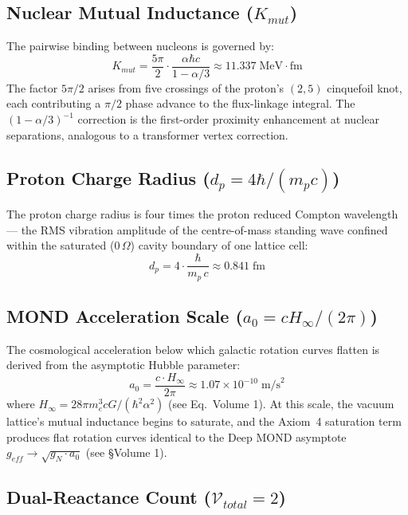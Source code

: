 \subsection{Nuclear Mutual Inductance ($K_{mut}$)}

The pairwise binding between nucleons is governed by:
\begin{equation}
    K_{mut} = \frac{5\pi}{2} \cdot \frac{\alpha \hbar c}{1 - \alpha/3}
    \approx 11.337\;\text{MeV}\cdot\text{fm}
\end{equation}
The factor $5\pi/2$ arises from five crossings of the proton's
$(2,5)$ cinquefoil knot, each contributing a $\pi/2$ phase advance
to the flux-linkage integral.  The $(1 - \alpha/3)^{-1}$ correction
is the first-order proximity enhancement at nuclear separations,
analogous to a transformer vertex correction.

\subsection{Proton Charge Radius ($d_p = 4\hbar/(m_p c)$)}

The proton charge radius is four times the proton reduced Compton
wavelength --- the RMS vibration amplitude of the centre-of-mass
standing wave confined within the saturated ($0\,\Omega$) cavity
boundary of one lattice cell:
\begin{equation}
    d_p = 4 \cdot \frac{\hbar}{m_p \, c} \approx 0.841\;\text{fm}
\end{equation}

\subsection{MOND Acceleration Scale ($a_0 = c H_\infty / (2\pi)$)}

The cosmological acceleration below which galactic rotation curves
flatten is derived from the asymptotic Hubble parameter:
\begin{equation}
    a_0 = \frac{c \cdot H_\infty}{2\pi}
    \approx 1.07 \times 10^{-10}\;\text{m/s}^2
\end{equation}
where $H_\infty = 28\pi m_e^3 c G / (\hbar^2 \alpha^2)$ (see
Eq.~Volume 1).  At this scale, the vacuum lattice's
mutual inductance begins to saturate, and the Axiom~4 saturation
term produces flat rotation curves identical to the Deep MOND
asymptote $g_{eff} \to \sqrt{g_N \cdot a_0}$ (see
\S Volume 1).

\subsection{Dual-Reactance Count ($\mathcal{V}_{total} = 2$)}

